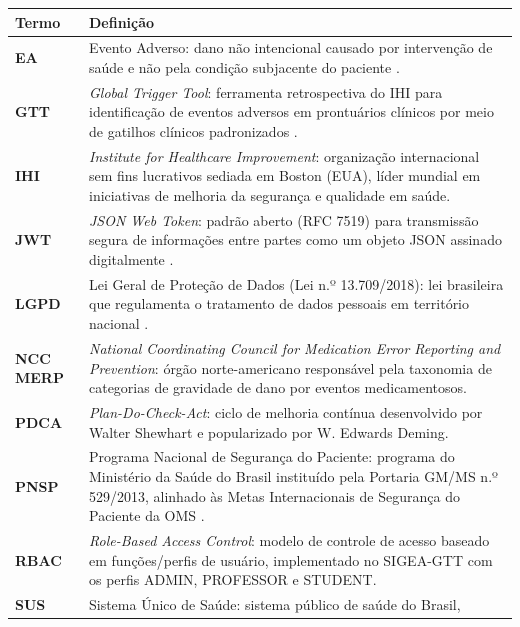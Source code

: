 \begin{anexosenv}
\begin{quadro}[htb]
\centering
\small
\caption{Glossário de termos técnicos e clínicos do SIGEA-GTT.}
\label{qua_glossario}
\begin{tabularx}{\textwidth}{l X}
\toprule
\textbf{Termo} & \textbf{Definição} \\
\midrule
\textbf{EA} & Evento Adverso: dano não intencional causado por intervenção
  de saúde e não pela condição subjacente do paciente \cite{who2009patient}. \\
\midrule
\textbf{GTT} & \textit{Global Trigger Tool}: ferramenta retrospectiva do IHI
  para identificação de eventos adversos em prontuários clínicos por meio de
  gatilhos clínicos padronizados \cite{griffin2009ihi}. \\
\midrule
\textbf{IHI} & \textit{Institute for Healthcare Improvement}: organização
  internacional sem fins lucrativos sediada em Boston (EUA), líder mundial
  em iniciativas de melhoria da segurança e qualidade em saúde. \\
\midrule
\textbf{JWT} & \textit{JSON Web Token}: padrão aberto (RFC 7519) para
  transmissão segura de informações entre partes como um objeto JSON
  assinado digitalmente \cite{jwt_rfc7519}. \\
\midrule
\textbf{LGPD} & Lei Geral de Proteção de Dados (Lei n.º 13.709/2018):
  lei brasileira que regulamenta o tratamento de dados pessoais em
  território nacional \cite{lgpd2018}. \\
\midrule
\textbf{NCC MERP} & \textit{National Coordinating Council for Medication
  Error Reporting and Prevention}: órgão norte-americano responsável pela
  taxonomia de categorias de gravidade de dano por eventos medicamentosos. \\
\midrule
\textbf{PDCA} & \textit{Plan-Do-Check-Act}: ciclo de melhoria contínua
  desenvolvido por Walter Shewhart e popularizado por W. Edwards Deming. \\
\midrule
\textbf{PNSP} & Programa Nacional de Segurança do Paciente: programa
  do Ministério da Saúde do Brasil instituído pela Portaria GM/MS
  n.º 529/2013, alinhado às Metas Internacionais de Segurança do Paciente
  da OMS \cite{anvisa2017}. \\
\midrule
\textbf{RBAC} & \textit{Role-Based Access Control}: modelo de controle de
  acesso baseado em funções/perfis de usuário, implementado no SIGEA-GTT
  com os perfis ADMIN, PROFESSOR e STUDENT. \\
\midrule
\textbf{SUS} & Sistema Único de Saúde: sistema público de saúde do Brasil,

\end{tabularx}
\end{quadro}
\end{anexosenv}
